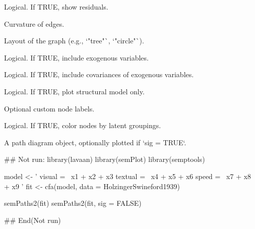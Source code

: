 \documentclass[a4paper]{book}
\begin{document}
\begin{Arguments}
\begin{ldescription}
\item[\code{residuals}] Logical. If TRUE, show residuals.

\item[\code{curve}] Curvature of edges.

\item[\code{layout}] Layout of the graph (e.g., `"tree"`, `"circle"`).

\item[\code{exoVar}] Logical. If TRUE, include exogenous variables.

\item[\code{exoCov}] Logical. If TRUE, include covariances of exogenous variables.

\item[\code{structual}] Logical. If TRUE, plot structural model only.

\item[\code{nodeLabels}] Optional custom node labels.

\item[\code{groups}] Logical. If TRUE, color nodes by latent groupings.
\end{ldescription}
\end{Arguments}
%
\begin{Value}
A path diagram object, optionally plotted if `sig = TRUE`.
\end{Value}
%
\begin{Examples}
\begin{ExampleCode}
\#\# Not run: 
library(lavaan)
library(semPlot)
library(semptools)

model <- '
  visual  =~ x1 + x2 + x3
  textual =~ x4 + x5 + x6
  speed   =~ x7 + x8 + x9
'
fit <- cfa(model, data = HolzingerSwineford1939)

semPaths2(fit)
semPaths2(fit, sig = FALSE)

## End(Not run)
\end{ExampleCode}
\end{Examples}
\end{document}
